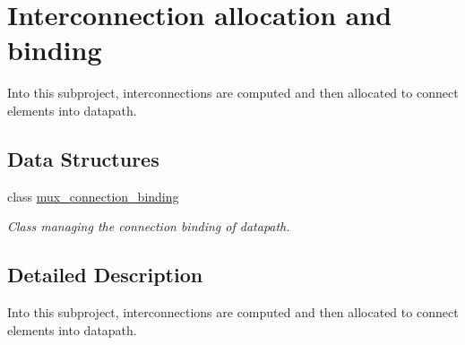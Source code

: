 \hypertarget{group__interconnect}{}\section{Interconnection allocation and binding}
\label{group__interconnect}


Into this subproject, interconnections are computed and then allocated to connect elements into datapath.  


\subsection*{Data Structures}
\begin{DoxyCompactItemize}
\item 
class \hyperlink{classmux__connection__binding}{mux\+\_\+connection\+\_\+binding}
\begin{DoxyCompactList}\small\item\em Class managing the connection binding of datapath. \end{DoxyCompactList}\end{DoxyCompactItemize}


\subsection{Detailed Description}
Into this subproject, interconnections are computed and then allocated to connect elements into datapath. 


